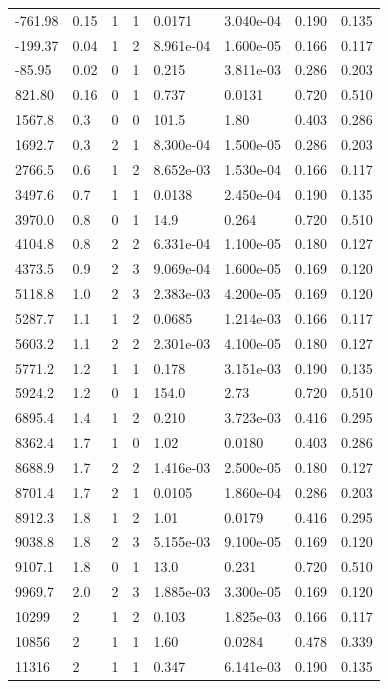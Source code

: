 \documentclass[preview]{standalone}
\begin{document}
{{\begin{tabular}{L{1.2cm}C{1.2cm} C{0.3cm}C{0.5cm} C{1.4cm}C{1.4cm} C{1.4cm}C{1.4cm}}
  -761.98  &  0.15  & 1     &  1 &  0.0171  & 3.040e-04  & 0.190 &  0.135   \\ 
  -199.37  &  0.04  & 1     &  2 &  8.961e-04  & 1.600e-05  & 0.166 &  0.117   \\ 
  -85.95  &  0.02  & 0     &  1 &  0.215  & 3.811e-03  & 0.286 &  0.203   \\ 
  821.80  &  0.16  & 0     &  1 &  0.737  & 0.0131  & 0.720 &  0.510   \\ 
  1567.8  &   0.3  & 0     &  0 &  101.5  & 1.80  & 0.403 &  0.286   \\ 
  1692.7  &   0.3  & 2     &  1 &  8.300e-04  & 1.500e-05  & 0.286 &  0.203   \\ 
  2766.5  &   0.6  & 1     &  2 &  8.652e-03  & 1.530e-04  & 0.166 &  0.117   \\ 
  3497.6  &   0.7  & 1     &  1 &  0.0138  & 2.450e-04  & 0.190 &  0.135   \\ 
  3970.0  &   0.8  & 0     &  1 &  14.9  & 0.264  & 0.720 &  0.510   \\ 
  4104.8  &   0.8  & 2     &  2 &  6.331e-04  & 1.100e-05  & 0.180 &  0.127   \\ 
  4373.5  &   0.9  & 2     &  3 &  9.069e-04  & 1.600e-05  & 0.169 &  0.120   \\ 
  5118.8  &   1.0  & 2     &  3 &  2.383e-03  & 4.200e-05  & 0.169 &  0.120   \\ 
  5287.7  &   1.1  & 1     &  2 &  0.0685  & 1.214e-03  & 0.166 &  0.117   \\ 
  5603.2  &   1.1  & 2     &  2 &  2.301e-03  & 4.100e-05  & 0.180 &  0.127   \\ 
  5771.2  &   1.2  & 1     &  1 &  0.178  & 3.151e-03  & 0.190 &  0.135   \\ 
  5924.2  &   1.2  & 0     &  1 &  154.0  & 2.73  & 0.720 &  0.510   \\ 
  6895.4  &   1.4  & 1     &  2 &  0.210  & 3.723e-03  & 0.416 &  0.295   \\ 
  8362.4  &   1.7  & 1     &  0 &  1.02  & 0.0180  & 0.403 &  0.286   \\ 
  8688.9  &   1.7  & 2     &  2 &  1.416e-03  & 2.500e-05  & 0.180 &  0.127   \\ 
  8701.4  &   1.7  & 2     &  1 &  0.0105  & 1.860e-04  & 0.286 &  0.203   \\ 
  8912.3  &   1.8  & 1     &  2 &  1.01  & 0.0179  & 0.416 &  0.295   \\ 
  9038.8  &   1.8  & 2     &  3 &  5.155e-03  & 9.100e-05  & 0.169 &  0.120   \\ 
  9107.1  &   1.8  & 0     &  1 &  13.0  & 0.231  & 0.720 &  0.510   \\ 
  9969.7  &   2.0  & 2     &  3 &  1.885e-03  & 3.300e-05  & 0.169 &  0.120   \\ 
  10299  &     2  & 1     &  2 &  0.103  & 1.825e-03  & 0.166 &  0.117   \\ 
  10856  &     2  & 1     &  1 &  1.60  & 0.0284  & 0.478 &  0.339   \\ 
  11316  &     2  & 1     &  1 &  0.347  & 6.141e-03  & 0.190 &  0.135   \\ 
\hline 
\end{tabular} 

}}
\end{document}
